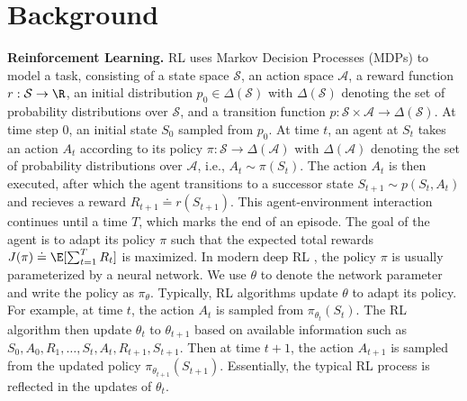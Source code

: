 \documentclass{article} %
\newcommand{\fS}{\mathcal{S}}
\newcommand{\fA}{\mathcal{A}}
\newcommand{\0}{\mathbf{0}}
\begin{document}

\section{Background}

\textbf{Reinforcement Learning.}
RL uses Markov Decision Processes (MDPs) to model a task,
consisting of a state space $\fS$,
an action space $\fA$,
a reward function $r: \fS \to \R$,
an initial distribution $p_0 \in \Delta(\fS)$ with $\Delta(\fS)$ denoting the set of probability distributions over $\fS$,
and a transition function $p: \fS \times \fA \to \Delta(\fS)$.
At time step 0,
an initial state $S_0$ sampled from $p_0$.
At time $t$,
an agent at $S_t$ takes an action $A_t$ according to its policy $\pi: \fS \to \Delta(\fA)$ with $\Delta(\fA)$ denoting the set of probability distributions over $\fA$, i.e., $A_t \sim \pi(S_t)$.
The action $A_t$ is then executed,
after which the agent transitions to a successor state $S_{t+1} \sim p(S_t, A_t)$ and recieves a reward $R_{t+1} \doteq r(S_{t+1})$.
This agent-environment interaction continues until a time $T$,
which marks the end of an episode.
The goal of the agent is to adapt its policy $\pi$ such that the expected total rewards $J(\pi) \doteq \E[\sum_{t=1}^T R_t]$ is maximized.
In modern deep RL \citep{mnih2015human,schulman2017proximal},
the policy $\pi$ is usually parameterized by a neural network. 
We use $\theta$ to denote the network parameter and write the policy as $\pi_\theta$.
Typically, RL algorithms update $\theta$ to adapt its policy.
For example, at time $t$,
the action $A_t$ is sampled from $\pi_{\theta_t}(S_t)$.
The RL algorithm then update $\theta_t$ to $\theta_{t+1}$ based on available information such as $S_0, A_0, R_1, \dots, S_t, A_t, R_{t+1}, S_{t+1}$.
Then at time $t+1$,
the action $A_{t+1}$ is sampled from the updated policy $\pi_{\theta_{t+1}}(S_{t+1})$.
Essentially, the typical RL process is reflected in the updates of ${\theta_t}$.
\end{document}
